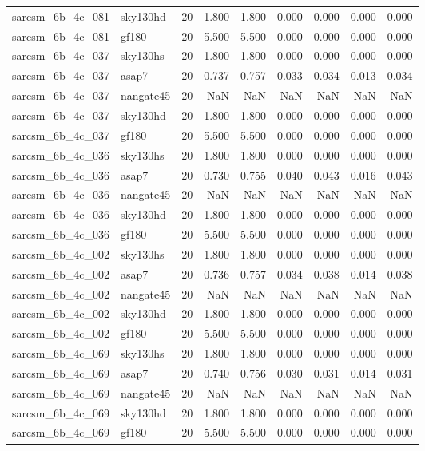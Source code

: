 \begin{tabular}{llrrrrrrr}
sarcsm\_6b\_4c\_081 & sky130hd & 20 & 1.800 & 1.800 & 0.000 & 0.000 & 0.000 & 0.000 \\
sarcsm\_6b\_4c\_081 & gf180 & 20 & 5.500 & 5.500 & 0.000 & 0.000 & 0.000 & 0.000 \\
sarcsm\_6b\_4c\_037 & sky130hs & 20 & 1.800 & 1.800 & 0.000 & 0.000 & 0.000 & 0.000 \\
sarcsm\_6b\_4c\_037 & asap7 & 20 & 0.737 & 0.757 & 0.033 & 0.034 & 0.013 & 0.034 \\
sarcsm\_6b\_4c\_037 & nangate45 & 20 & NaN & NaN & NaN & NaN & NaN & NaN \\
sarcsm\_6b\_4c\_037 & sky130hd & 20 & 1.800 & 1.800 & 0.000 & 0.000 & 0.000 & 0.000 \\
sarcsm\_6b\_4c\_037 & gf180 & 20 & 5.500 & 5.500 & 0.000 & 0.000 & 0.000 & 0.000 \\
sarcsm\_6b\_4c\_036 & sky130hs & 20 & 1.800 & 1.800 & 0.000 & 0.000 & 0.000 & 0.000 \\
sarcsm\_6b\_4c\_036 & asap7 & 20 & 0.730 & 0.755 & 0.040 & 0.043 & 0.016 & 0.043 \\
sarcsm\_6b\_4c\_036 & nangate45 & 20 & NaN & NaN & NaN & NaN & NaN & NaN \\
sarcsm\_6b\_4c\_036 & sky130hd & 20 & 1.800 & 1.800 & 0.000 & 0.000 & 0.000 & 0.000 \\
sarcsm\_6b\_4c\_036 & gf180 & 20 & 5.500 & 5.500 & 0.000 & 0.000 & 0.000 & 0.000 \\
sarcsm\_6b\_4c\_002 & sky130hs & 20 & 1.800 & 1.800 & 0.000 & 0.000 & 0.000 & 0.000 \\
sarcsm\_6b\_4c\_002 & asap7 & 20 & 0.736 & 0.757 & 0.034 & 0.038 & 0.014 & 0.038 \\
sarcsm\_6b\_4c\_002 & nangate45 & 20 & NaN & NaN & NaN & NaN & NaN & NaN \\
sarcsm\_6b\_4c\_002 & sky130hd & 20 & 1.800 & 1.800 & 0.000 & 0.000 & 0.000 & 0.000 \\
sarcsm\_6b\_4c\_002 & gf180 & 20 & 5.500 & 5.500 & 0.000 & 0.000 & 0.000 & 0.000 \\
sarcsm\_6b\_4c\_069 & sky130hs & 20 & 1.800 & 1.800 & 0.000 & 0.000 & 0.000 & 0.000 \\
sarcsm\_6b\_4c\_069 & asap7 & 20 & 0.740 & 0.756 & 0.030 & 0.031 & 0.014 & 0.031 \\
sarcsm\_6b\_4c\_069 & nangate45 & 20 & NaN & NaN & NaN & NaN & NaN & NaN \\
sarcsm\_6b\_4c\_069 & sky130hd & 20 & 1.800 & 1.800 & 0.000 & 0.000 & 0.000 & 0.000 \\
sarcsm\_6b\_4c\_069 & gf180 & 20 & 5.500 & 5.500 & 0.000 & 0.000 & 0.000 & 0.000 \\

\end{tabular}
